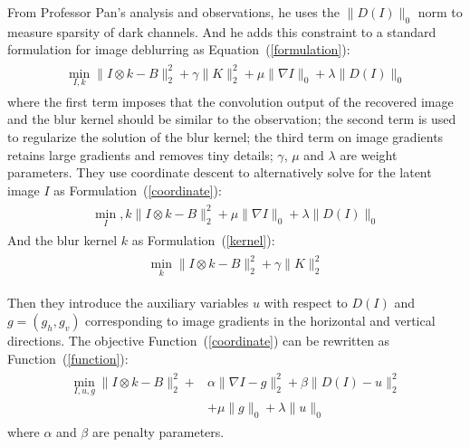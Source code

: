 \documentclass[twocolumn]{article}
\begin{document}
	From Professor Pan's analysis and observations, he uses the $\parallel D(I)\parallel_0$ norm to measure sparsity of dark channels. And he adds this constraint to a standard formulation for image deblurring as Equation~(\ref{formulation}):
	\begin{equation}
	\begin{aligned}
	\begin{split}
	\min_{I,k} \parallel I\otimes k-B \parallel_2^2+\gamma \parallel K \parallel_2^2 +\mu \parallel \nabla I\parallel_0+\lambda \parallel D(I) \parallel_0   \label{formulation}
	\end{split} 
	\end{aligned}
	\end{equation}
	where the first term imposes that the convolution output of the recovered image and the blur kernel should be similar to the observation; the second term is used to regularize the solution of the blur kernel; the third term on image gradients retains large gradients and removes tiny details\cite{Pan2014Deblurring}; $\gamma$, $\mu$ and $\lambda$ are weight parameters. They use coordinate descent to alternatively solve for the latent image $I$ as Formulation~(\ref{coordinate}):
	\begin{equation}
	\begin{aligned}
	\begin{split}
	\min_I,k\parallel I\otimes k-B \parallel_2^2+\mu \parallel \nabla I\parallel_0+\lambda \parallel D(I) \parallel_0    \label{coordinate}
	\end{split}
	\end{aligned}
	\end{equation}
	And the blur kernel $k$ as Formulation~(\ref{kernel}):
	\begin{equation}
	\begin{aligned}
	\begin{split}
	\min_k \parallel I\otimes k-B \parallel_2^2+\gamma \parallel K \parallel_2^2 \label{kernel}
	\end{split}
	\end{aligned}
	\end{equation}

	Then they introduce the auxiliary variables $u$ with respect to $D(I)$ and $g = (g_h, g_v)$ corresponding to image gradients in the horizontal and vertical directions. The objective Function~(\ref{coordinate}) can be rewritten as Function~(\ref{function}):
	\begin{equation}
	\begin{aligned}
	\begin{split}
	\min_{I,u,g} \parallel I\otimes k-B \parallel_2^2+&\alpha \parallel \nabla I-g \parallel_2^2+\beta \parallel D(I)-u \parallel_2^2 \\
	&+\mu \parallel g\parallel_0+\lambda\parallel u\parallel_0     \label{function}
	\end{split}
	\end{aligned}
	\end{equation}
	where $\alpha$ and $\beta$ are penalty parameters.
	
\end{document}
